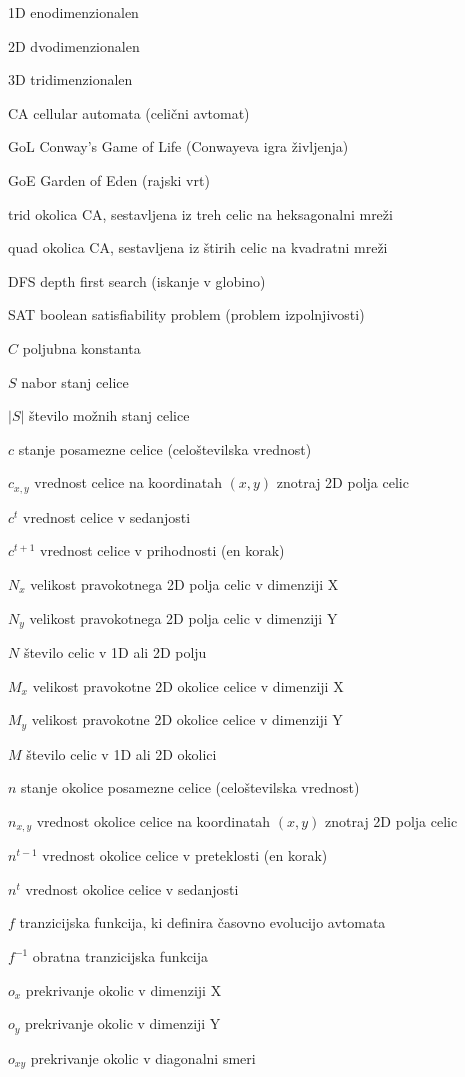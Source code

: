 \documentclass[12pt,a4paper,openany,twoside]{book}
\newcommand{\abbrlabel}[1]{\makebox[3cm][l]{\textbf{#1}\ \dotfill}}
\newenvironment{abbreviations}{\begin{list}{}{\renewcommand{\makelabel}{\abbrlabel}}}{\end{list}}
\begin{document}
\begin{abbreviations}
\item[1D] enodimenzionalen
\item[2D] dvodimenzionalen
\item[3D] tridimenzionalen
\item[CA] cellular automata (celični avtomat)
\item[GoL] Conway's Game of Life (Conwayeva igra življenja)
\item[GoE] Garden of Eden (rajski vrt)
\item[trid] okolica CA, sestavljena iz treh celic na heksagonalni mreži
\item[quad] okolica CA, sestavljena iz štirih celic na kvadratni mreži
\item[DFS] depth first search (iskanje v globino)
\item[SAT] boolean satisfiability problem (problem izpolnjivosti)

\item[\(C\)] poljubna konstanta
\item[\(S\)] nabor stanj celice
\item[\(|S|\)] število možnih stanj celice
\item[\(c\)] stanje posamezne celice (celoštevilska vrednost)
\item[\(c_{x,y}\)] vrednost celice na koordinatah \((x,y)\) znotraj 2D polja celic
\item[\(c^t\)] vrednost celice v sedanjosti
\item[\(c^{t+1}\)] vrednost celice v prihodnosti (en korak)
\item[\(N_x\)] velikost pravokotnega 2D polja celic v dimenziji X
\item[\(N_y\)] velikost pravokotnega 2D polja celic v dimenziji Y
\item[\(N\)] število celic v 1D ali 2D polju
\item[\(M_x\)] velikost pravokotne 2D okolice celice v dimenziji X
\item[\(M_y\)] velikost pravokotne 2D okolice celice v dimenziji Y
\item[\(M\)] število celic v 1D ali 2D okolici
\item[\(n\)] stanje okolice posamezne celice (celoštevilska vrednost)
\item[\(n_{x,y}\)] vrednost okolice celice na koordinatah \((x,y)\) znotraj 2D polja celic
\item[\(n^{t-1}\)] vrednost okolice celice v preteklosti (en korak)
\item[\(n^t\)] vrednost okolice celice v sedanjosti
\item[\(f\)] tranzicijska funkcija, ki definira časovno evolucijo avtomata
\item[\(f^{-1}\)] obratna tranzicijska funkcija
\item[\(o_x\)] prekrivanje okolic v dimenziji X
\item[\(o_y\)] prekrivanje okolic v dimenziji Y
\item[\(o_{xy}\)] prekrivanje okolic v diagonalni smeri
\end{abbreviations}
\end{document}
